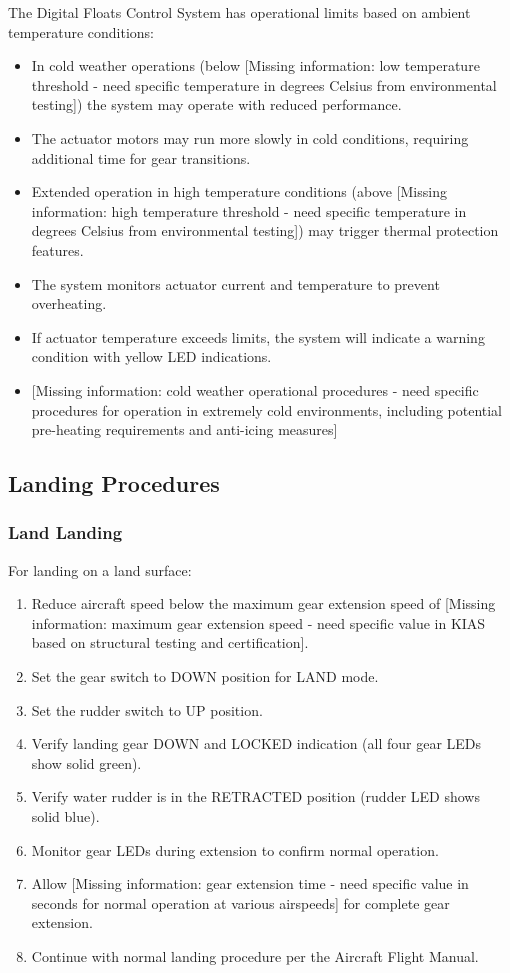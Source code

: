\documentclass[12pt,a4paper,twoside,openright]{book}
\begin{document}
The Digital Floats Control System has operational limits based on ambient temperature conditions:

    \begin{itemize}
    \item In cold weather operations (below {\color{red}[Missing information: low temperature threshold - need specific temperature in degrees Celsius from environmental testing]}) the system may operate with reduced performance.
    \item The actuator motors may run more slowly in cold conditions, requiring additional time for gear transitions.
    \item Extended operation in high temperature conditions (above {\color{red}[Missing information: high temperature threshold - need specific temperature in degrees Celsius from environmental testing]}) may trigger thermal protection features.
    \item The system monitors actuator current and temperature to prevent overheating.
    \item If actuator temperature exceeds limits, the system will indicate a warning condition with yellow LED indications.
    \item {\color{red}[Missing information: cold weather operational procedures - need specific procedures for operation in extremely cold environments, including potential pre-heating requirements and anti-icing measures]}
    \end{itemize}
    
\subsection{Landing Procedures}

\subsubsection{Land Landing}
For landing on a land surface:

\begin{enumerate}
    \item Reduce aircraft speed below the maximum gear extension speed of {\color{red}[Missing information: maximum gear extension speed - need specific value in KIAS based on structural testing and certification]}.
    \item Set the gear switch to DOWN position for LAND mode.
    \item Set the rudder switch to UP position.
    \item Verify landing gear DOWN and LOCKED indication (all four gear LEDs show solid green).
    \item Verify water rudder is in the RETRACTED position (rudder LED shows solid blue).
    \item Monitor gear LEDs during extension to confirm normal operation.
    \item Allow {\color{red}[Missing information: gear extension time - need specific value in seconds for normal operation at various airspeeds]} for complete gear extension.
    \item Continue with normal landing procedure per the Aircraft Flight Manual.
\end{enumerate}
\end{document}

